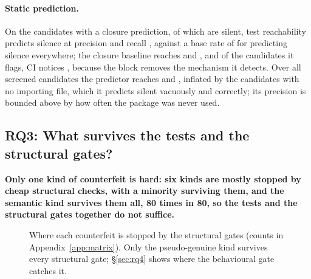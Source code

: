 \documentclass[11pt]{article}
\begin{document}
\paragraph{Static prediction.}
On the \nPredSubset{} candidates with a closure prediction, of which \nPredSubsetSilent{} are silent, test reachability predicts silence at precision \predPrecision{} and recall \predRecall, against a base rate of \predBaseRate{} for predicting silence everywhere; the closure baseline reaches \closurePrecision{} and \closureRecall, and of the \closureFlagged{} candidates it flags, CI notices \closureNoticed, because the block removes the mechanism it detects.
Over all \nScreened{} screened candidates the predictor reaches \predPrecisionAll{} and \predRecallAll, inflated by the candidates with no importing file, which it predicts silent vacuously and correctly; its precision is bounded above by how often the package was never used.

\subsection{RQ3: What survives the tests and the structural gates?}
\label{sec:rq3}

\textbf{Only one kind of counterfeit is hard: six kinds are mostly stopped by cheap structural checks, with a minority surviving them, and the semantic kind survives them all, 80 times in 80, so the tests and the structural gates together do not suffice.}

\begin{figure}[t]
\centering
{}
\caption{Where each counterfeit is stopped by the structural gates (counts in Appendix~\ref{app:matrix}). Only the pseudo-genuine kind survives every structural gate; \S\ref{sec:rq4} shows where the behavioural gate catches it.}
\label{fig:stopped}
\end{figure}
\end{document}
